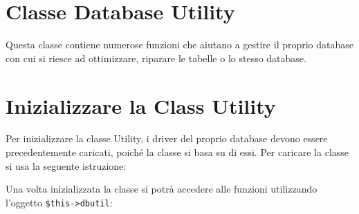 \section*{Classe Database Utility}
Questa classe contiene numerose funzioni che aiutano a gestire il proprio database con cui si riesce ad ottimizzare, riparare le tabelle o lo stesso database.

\section*{Inizializzare la Class Utility}
Per inizializzare la classe Utility, i driver del proprio database devono essere precedentemente caricati, poiché la classe si basa su di essi. Per caricare la classe si usa la seguente istruzione:


Una volta inizializzata la classe si potrà accedere alle funzioni utilizzando l'oggetto \verb|$this->dbutil|:


